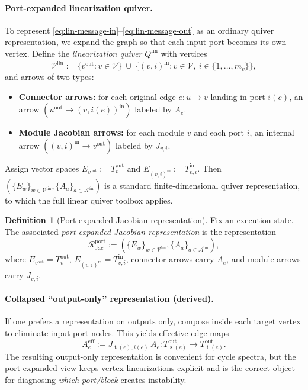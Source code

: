 \documentclass[11pt]{article}
\theoremstyle{definition}
\newtheorem{definition}{Definition}[section]
\theoremstyle{plain}
\theoremstyle{remark}
\newcommand{\mc}[1]{\mathcal{#1}}
\newcommand{\Nodes}{\mc{V}}
\newcommand{\Edges}{\mc{A}}
\newcommand{\src}{\operatorname{s}}
\newcommand{\tgt}{\operatorname{t}}
\begin{document}
\paragraph{Port-expanded linearization quiver.}
To represent \eqref{eq:lin-message-in}--\eqref{eq:lin-message-out} as an ordinary quiver representation, we expand the graph so that each input port becomes its own vertex.
Define the \emph{linearization quiver} $Q^{\mathrm{lin}}$ with vertices
\[
\Nodes^{\mathrm{lin}} := \{v^{\text{out}}:v\in\Nodes\}\ \cup\ \{(v,i)^{\text{in}}: v\in\Nodes,\ i\in\{1,\dots,m_v\}\},
\]
and arrows of two types:
\begin{itemize}[leftmargin=2em]
\item \textbf{Connector arrows:} for each original edge $e:u\to v$ landing in port $i(e)$, an arrow
$(u^{\text{out}}\to (v,i(e))^{\text{in}})$ labeled by $A_e$.
\item \textbf{Module Jacobian arrows:} for each module $v$ and each port $i$, an internal arrow
$((v,i)^{\text{in}}\to v^{\text{out}})$ labeled by $J_{v,i}$.
\end{itemize}
Assign vector spaces $E_{v^{\text{out}}}:=T^{\text{out}}_v$ and $E_{(v,i)^{\text{in}}}:=T^{\text{in}}_{v,i}$.
Then $(\{E_w\}_{w\in\Nodes^{\mathrm{lin}}},\{A_a\}_{a\in\Edges^{\mathrm{lin}}})$ is a standard finite-dimensional quiver representation, to which the full linear quiver toolbox applies.

\begin{definition}[Port-expanded Jacobian representation]
Fix an execution state.
The associated \emph{port-expanded Jacobian representation} is the representation
\[
\mc{R}^{\mathrm{port}}_{\mathrm{Jac}} := (\{E_w\}_{w\in\Nodes^{\mathrm{lin}}},\{A_a\}_{a\in\Edges^{\mathrm{lin}}}),
\]
where $E_{v^{\text{out}}}=T^{\text{out}}_v$, $E_{(v,i)^{\text{in}}}=T^{\text{in}}_{v,i}$, connector arrows carry $A_e$, and module arrows carry $J_{v,i}$.
\end{definition}

\paragraph{Collapsed ``output-only'' representation (derived).}
If one prefers a representation on outputs only, compose inside each target vertex to eliminate input-port nodes.
This yields effective edge maps
\begin{equation}
A_e^{\mathrm{eff}} := J_{\tgt(e),i(e)}\,A_e : T^{\text{out}}_{\src(e)}\to T^{\text{out}}_{\tgt(e)}.
\label{eq:linearized-edge}
\end{equation}
The resulting output-only representation is convenient for cycle spectra, but the port-expanded view keeps vertex linearizations explicit and is the correct object for diagnosing \emph{which port/block} creates instability.
\end{document}
